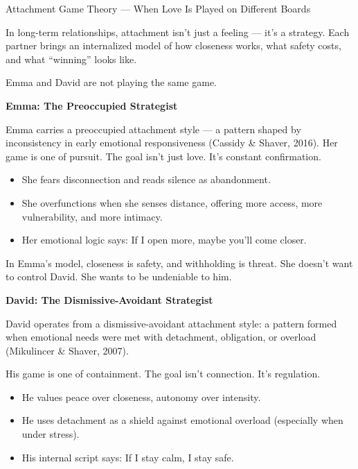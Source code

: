 \medskip

\begin{TechnicalSidebar}{Attachment Game Theory — When Love Is Played on Different Boards}

  In long-term relationships, attachment isn’t just a feeling — it’s a strategy.
  Each partner brings an internalized model of how closeness works, what safety costs, and what 
  ``winning'' looks like.

  \medskip
  
  Emma and David are not playing the same game.
  
  \medskip
  
  \textbf{Emma: The Preoccupied Strategist}
  
  Emma carries a preoccupied attachment style — a pattern shaped by inconsistency in early 
  emotional responsiveness (Cassidy \& Shaver, 2016).  
  Her game is one of pursuit. The goal isn’t just love. It’s constant confirmation.
  
  \medskip
  
  \begin{itemize}
    \item She fears disconnection and reads silence as abandonment.
    \item She overfunctions when she senses distance, offering more access, more vulnerability, 
    and more intimacy.
    \item Her emotional logic says: If I open more, maybe you’ll come closer.
  \end{itemize}
  
  \medskip
  
  In Emma’s model, closeness is safety, and withholding is threat.  
  She doesn’t want to control David. She wants to be undeniable to him.  
  
  \medskip
  
  \textbf{David: The Dismissive-Avoidant Strategist}

  \medskip
  
  David operates from a dismissive-avoidant attachment style: a pattern formed when emotional 
  needs were met with detachment, obligation, or overload (Mikulincer \& Shaver, 2007).

  \medskip
  
  His game is one of containment. The goal isn’t connection. It’s regulation.

  \medskip
  
  \begin{itemize}
    \item He values peace over closeness, autonomy over intensity.
    \item He uses detachment as a shield against emotional overload (especially when under stress).
    \item His internal script says: If I stay calm, I stay safe.
  \end{itemize}


\end{TechnicalSidebar}
